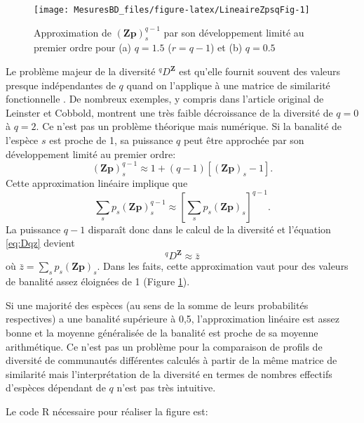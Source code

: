 \documentclass[
  11pt,
  french,
  a4paper,
  extrafontsizes,onecolumn,openright
  ]{memoir}
\begin{document}
\begin{figure}

{\centering \texttt{[image: MesuresBD\_files/figure-latex/LineaireZpsqFig-1]} 

}

\caption{Approximation de \({(\mathbf{Zp})}_{s}^{q-1}\) par son développement limité au premier ordre pour (a) \(q=1.5\) (\(r=q-1\)) et (b) \(q=0.5\)}\label{fig:LineaireZpsqFig}
\end{figure}

\normalsize

Le problème majeur de la diversité \(^q\!D^{\mathbf{Z}}\) est qu'elle fournit souvent des valeurs presque indépendantes de \(q\) quand on l'applique à une matrice de similarité fonctionnelle \autocite{Chiu2014b}.
De nombreux exemples, y compris dans l'article original de Leinster et Cobbold, montrent une très faible décroissance de la diversité de \(q=0\) à \(q=2\).
Ce n'est pas un problème théorique mais numérique.
Si la banalité de l'espèce \(s\) est proche de 1, sa puissance \(q\) peut être approchée par son développement limité au premier ordre:
\[{(\mathbf{Zp})}_{s}^{q-1} \approx 1 + (q-1)[{(\mathbf{Zp})}_{s} - 1].\]
Cette approximation linéaire implique que
\[\sum_s{p_s{\left(\mathbf{Zp}\right)}^{q-1}_s} \approx [\sum_s{p_s{\left(\mathbf{Zp}\right)}_s}]^{q-1}.\]
La puissance \(q-1\) disparaît donc dans le calcul de la diversité et l'équation \eqref{eq:Dqz} devient
\[^q\!D^{\mathbf{Z}} \approx \bar{z}\]
où \(\bar{z} = \sum_s{p_s (\mathbf{Zp})_s}\).
Dans les faits, cette approximation vaut pour des valeurs de banalité assez éloignées de 1 (Figure \ref{fig:LineaireZpsqFig}).

Si une majorité des espèces (au sens de la somme de leurs probabilités respectives) a une banalité supérieure à 0,5, l'approximation linéaire est assez bonne et la moyenne généralisée de la banalité est proche de sa moyenne arithmétique.
Ce n'est pas un problème pour la comparaison de profils de diversité de communautés différentes calculés à partir de la même matrice de similarité mais l'interprétation de la diversité en termes de nombres effectifs d'espèces dépendant de \(q\) n'est pas très intuitive.

Le code R nécessaire pour réaliser la figure est:

\scriptsize
\end{document}
